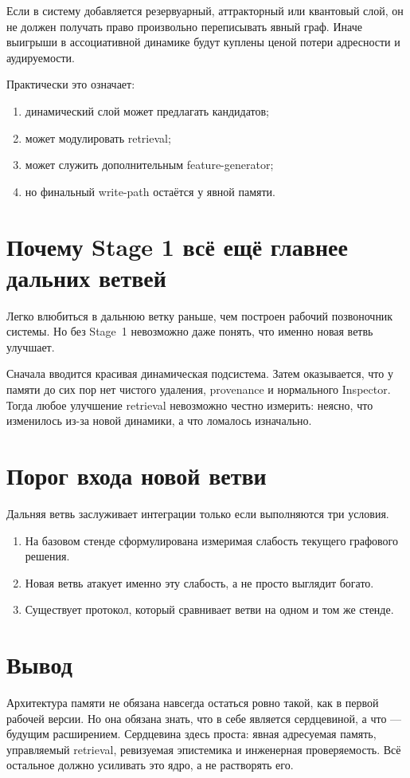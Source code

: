 \begin{principle}
Если в систему добавляется резервуарный, аттракторный или квантовый слой, он не
должен получать право произвольно переписывать явный граф. Иначе выигрыши в
ассоциативной динамике будут куплены ценой потери адресности и аудируемости.
\end{principle}

Практически это означает:
\begin{enumerate}
\item динамический слой может предлагать кандидатов;
\item может модулировать retrieval;
\item может служить дополнительным feature-generator;
\item но финальный write-path остаётся у явной памяти.
\end{enumerate}

\section{Почему Stage 1 всё ещё главнее дальних ветвей}

Легко влюбиться в дальнюю ветку раньше, чем построен рабочий позвоночник системы.
Но без Stage~1 невозможно даже понять, что именно новая ветвь улучшает.

\begin{workedbox}
Сначала вводится красивая динамическая подсистема. Затем оказывается, что у памяти
до сих пор нет чистого удаления, provenance и нормального Inspector. Тогда любое
улучшение retrieval невозможно честно измерить: неясно, что изменилось из-за новой
динамики, а что ломалось изначально.
\end{workedbox}

\section{Порог входа новой ветви}

Дальняя ветвь заслуживает интеграции только если выполняются три условия.
\begin{enumerate}
\item На базовом стенде сформулирована измеримая слабость текущего графового решения.
\item Новая ветвь атакует именно эту слабость, а не просто выглядит богато.
\item Существует протокол, который сравнивает ветви на одном и том же стенде.
\end{enumerate}

\section{Вывод}

Архитектура памяти не обязана навсегда остаться ровно такой, как в первой рабочей
версии. Но она обязана знать, что в себе является сердцевиной, а что — будущим
расширением. Сердцевина здесь проста: явная адресуемая память, управляемый retrieval,
ревизуемая эпистемика и инженерная проверяемость. Всё остальное должно усиливать
это ядро, а не растворять его.
